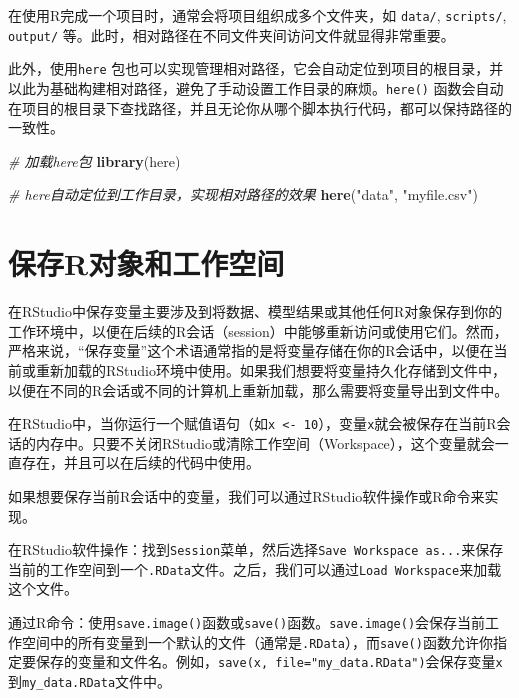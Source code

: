 \documentclass[
]{book}
\newenvironment{Shaded}{\begin{snugshade}}{\end{snugshade}}
\newcommand{\CommentTok}[1]{\textcolor[rgb]{0.56,0.35,0.01}{\textit{#1}}}
\newcommand{\FunctionTok}[1]{\textcolor[rgb]{0.13,0.29,0.53}{\textbf{#1}}}
\newcommand{\NormalTok}[1]{#1}
\newcommand{\StringTok}[1]{\textcolor[rgb]{0.31,0.60,0.02}{#1}}
\begin{document}
在使用R完成一个项目时，通常会将项目组织成多个文件夹，如 \texttt{data/}, \texttt{scripts/}, \texttt{output/} 等。此时，相对路径在不同文件夹间访问文件就显得非常重要。

此外，使用\texttt{here} 包也可以实现管理相对路径，它会自动定位到项目的根目录，并以此为基础构建相对路径，避免了手动设置工作目录的麻烦。\texttt{here()} 函数会自动在项目的根目录下查找路径，并且无论你从哪个脚本执行代码，都可以保持路径的一致性。

\begin{Shaded}
\begin{Highlighting}[]
\CommentTok{\# 加载here包}
\FunctionTok{library}\NormalTok{(here)}

\CommentTok{\# here自动定位到工作目录，实现相对路径的效果}
\FunctionTok{here}\NormalTok{(}\StringTok{"data"}\NormalTok{, }\StringTok{"myfile.csv"}\NormalTok{)}
\end{Highlighting}
\end{Shaded}

\section{保存R对象和工作空间}\label{ux4fddux5b58rux5bf9ux8c61ux548cux5de5ux4f5cux7a7aux95f4}

在RStudio中保存变量主要涉及到将数据、模型结果或其他任何R对象保存到你的工作环境中，以便在后续的R会话（session）中能够重新访问或使用它们。然而，严格来说，``保存变量''这个术语通常指的是将变量存储在你的R会话中，以便在当前或重新加载的RStudio环境中使用。如果我们想要将变量持久化存储到文件中，以便在不同的R会话或不同的计算机上重新加载，那么需要将变量导出到文件中。

在RStudio中，当你运行一个赋值语句（如\texttt{x\ \textless{}-\ 10}），变量\texttt{x}就会被保存在当前R会话的内存中。只要不关闭RStudio或清除工作空间（Workspace），这个变量就会一直存在，并且可以在后续的代码中使用。

如果想要保存当前R会话中的变量，我们可以通过RStudio软件操作或R命令来实现。

在RStudio软件操作：找到\texttt{Session}菜单，然后选择\texttt{Save\ Workspace\ as...}来保存当前的工作空间到一个\texttt{.RData}文件。之后，我们可以通过\texttt{Load\ Workspace}来加载这个文件。

通过R命令：使用\texttt{save.image()}函数或\texttt{save()}函数。\texttt{save.image()}会保存当前工作空间中的所有变量到一个默认的文件（通常是\texttt{.RData}），而\texttt{save()}函数允许你指定要保存的变量和文件名。例如，\texttt{save(x,\ file="my\_data.RData")}会保存变量\texttt{x}到\texttt{my\_data.RData}文件中。
\end{document}
